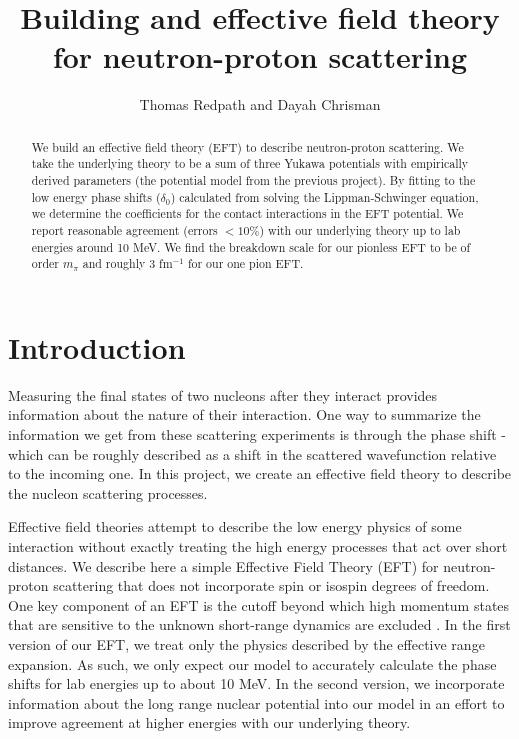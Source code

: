 \documentclass[10pt,showpacs,preprintnumbers,footinbib,amsmath,amssymb,aps,prl,twocolumn,groupedaddress,superscriptaddress,showkeys]{revtex4-1}
\begin{document}
\title{Building and effective field theory for neutron-proton scattering}
\author{Thomas Redpath and Dayah Chrisman}
\begin{abstract}

We build an effective field theory (EFT) to describe neutron-proton scattering. We take the
underlying theory to be a sum of three Yukawa potentials with empirically derived parameters
(the potential model from the previous project). By fitting to the low energy phase shifts
($\delta _0$) calculated from solving the Lippman-Schwinger equation, we determine the
coefficients for the contact interactions in the EFT potential. We report reasonable
agreement (errors $< 10 \%$) with our underlying theory up to lab energies around 10
MeV. We find the breakdown scale
for our pionless EFT to be of order $m_{\pi}$ and roughly 3 fm$^{-1}$ for our one pion
EFT.


\end{abstract}
\maketitle

\section{Introduction}

Measuring the final states of two nucleons after they interact provides information about
the nature of their interaction. One way to summarize the information we get from these
scattering experiments is through the phase shift - which can be roughly described as a
shift in the scattered wavefunction relative to the incoming one. In this project, we create
an effective field theory to describe the nucleon scattering processes.

Effective field theories attempt to describe the low energy physics of some interaction
without exactly treating the high energy processes that act over short distances.
We describe here a simple Effective Field Theory (EFT) for neutron-proton scattering
that does not incorporate spin or isospin degrees of freedom. One key component of
an EFT is the cutoff beyond which high momentum states that are sensitive to the
unknown short-range dynamics are excluded \citep{Lepage}.
In the first version of our EFT, we treat only the physics described by the effective range
expansion. As such, we only expect our model to accurately calculate the phase shifts for
lab energies up to about 10 MeV. In the second version, we incorporate information about
the long range nuclear potential into our model in an effort to improve agreement at higher
energies with our underlying theory.
\end{document}
